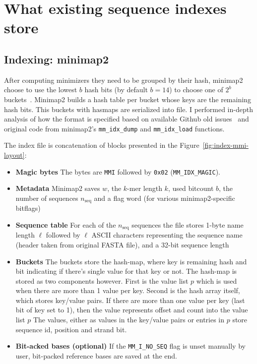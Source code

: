 \section{What existing sequence indexes store}
\label{sec:index-minimap2-comparison}

\subsection{Indexing: minimap2}

After computing minimizers they need to be grouped by their hash, minimap2 choose to use the lowest $b$ hash bits (by default $b=14$) to choose one of $2^b$ buckets~\autocite{minimap2_paper,minimap2_software}.
Minimap2 builds a hash table per bucket whose keys are the remaining hash bits. This buckets with hasmaps are serialized into  file.
I performed in-depth analysis of how the  format is specified based on available Github old issues~\autocite{minimap2_issue_820,minimap2_mmi_gist} and original code from minimap2's \texttt{mm\_idx\_dump} and \texttt{mm\_idx\_load} functions.
\noindent
{}

The index file is concatenation of blocks presented in the Figure~\ref{fig:index-mmi-layout}:
\begin{itemize}
  \item \textbf{Magic bytes} The bytes are \texttt{MMI} followed by
    \texttt{0x02} (\texttt{MM\_IDX\_MAGIC}).
  \item \textbf{Metadata} Minimap2 saves $w$, the $k$-mer
    length $k$, used bitcount $b$, the number of sequences
    $n_{\mathrm{seq}}$ and a flag word (for various minimap2-specific bitflags)
  \item \textbf{Sequence table} For each of the $n_{\mathrm{seq}}$ sequences
    the file stores 1-byte name length $\ell$ followed by $\ell$ ASCII characters representing the sequence name (header taken from original FASTA file), and
    a 32-bit sequence length
  \item \textbf{Buckets} The buckets store the hash-map, where key is remaining hash and bit indicating if there's single value for that key or not. 
    The hash-map is stored as two components however. 
    First is the value list $p$ which is used when there are more than 1 value per key.
    Second is the hash array itself, which stores key/value pairs.
    If there are more than one value per key (last bit of key set to 1), then the value represents offset and count into the value list $p$
    The values, either as values in the key/value pairs or entries in $p$ store sequence id, position and strand bit.
  \item \textbf{Bit-acked bases (optional)} If the \texttt{MM\_I\_NO\_SEQ} flag
    is unset manually by user, bit-packed reference bases are saved at the end.
\label{lst:high-level-mmi-index-format-description}
\end{itemize}

